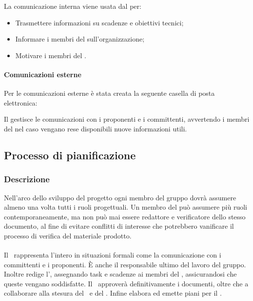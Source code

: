 La comunicazione interna viene usata dal  per:
\begin{itemize}
\item
Trasmettere informazioni su scadenze e obiettivi tecnici;
\item
Informare i membri del  sull'organizzazione;
\item
Motivare i membri del .
\end{itemize}

\paragraph{Comunicazioni esterne}
Per le comunicazioni esterne è stata creata la seguente casella di posta elettronica:

\begin{center} \email \end{center}

Il \Pm gestisce le comunicazioni con i proponenti e i committenti, avvertendo i membri del  nel caso vengano rese disponibili nuove informazioni utili.


\subsection{Processo di pianificazione}
\subsubsection{Descrizione}
Nell'arco dello sviluppo del progetto ogni membro del gruppo dovrà assumere almeno una volta tutti i ruoli progettuali.
Un membro del  può assumere più ruoli contemporaneamente, ma non può mai essere redattore e verificatore dello stesso documento, al fine di evitare conflitti di interesse che potrebbero vanificare il processo di verifica del materiale prodotto.

\paragraph{\Pm}
Il \Pm\ rappresenta l'intero  in situazioni formali come la comunicazione con i committenti e i proponenti. È anche il responsabile ultimo del lavoro del gruppo. Inoltre redige l', assegnando task e scadenze ai membri del , assicurandosi che queste vengano soddisfatte. 
Il \Pm\ approverà definitivamente i documenti, oltre che a collaborare alla stesura del \PdP\  e del \PdQ.
Infine elabora ed emette piani per il .

